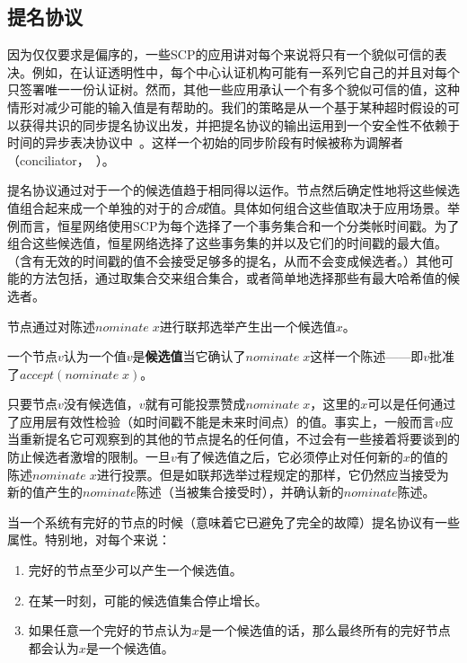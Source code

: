 \subsection{提名协议}

因为仅仅要求{\slot}是偏序的，一些SCP的应用讲对每个{\slot}来说将只有一个貌似可信的表决。例如，在认证透明性中，每个中心认证机构可能有一系列它自己的{\slot}并且对每个{\slot}只签署唯一一份认证树。然而，其他一些应用承认一个{\slot}有多个貌似可信的值，这种情形对减少可能的输入值是有帮助的。我们的策略是从一个基于某种超时假设的可以获得共识的同步提名协议出发，并把提名协议的输出运用到一个安全性不依赖于时间的异步表决协议中~\cite{Lamport:2011:BAL:2075029.2075043}。这样一个初始的同步阶段有时候被称为调解者（conciliator，~\cite{Aspnes:2010:MAS:1835698.1835802}）。

提名协议通过对于一个{\slot}的候选值趋于相同得以运作。节点然后确定性地将这些候选值组合起来成一个单独的对于{\slot}的\textit{合成}值。具体如何组合这些值取决于应用场景。举例而言，恒星网络使用SCP为每个{\slot}选择了一个事务集合和一个分类帐时间戳。为了组合这些候选值，恒星网络选择了这些事务集的并以及它们的时间戳的最大值。（含有无效的时间戳的值不会接受足够多的提名，从而不会变成候选者。）其他可能的方法包括，通过取集合交来组合集合，或者简单地选择那些有最大哈希值的候选者。

节点通过对陈述$nominate\;x$进行联邦选举产生出一个候选值$x$。

\begin{definition}[候选的]
	一个节点$v$认为一个值$v$是\textbf{候选值}当它确认了$nominate\;x$这样一个陈述——即$v$批准了$accept(nominate\;x)$。
\end{definition}

只要节点$v$没有候选值，$v$就有可能投票赞成$nominate\;x$，这里的$x$可以是任何通过了应用层有效性检验（如时间戳不能是未来时间点）的值。事实上，一般而言$v$应当重新提名它可观察到的其他的节点提名的任何值，不过会有一些接着将要谈到的防止候选者激增的限制。一旦$v$有了候选值之后，它必须停止对任何新的$x$的值的陈述$nominate\;x$进行投票。但是如联邦选举过程规定的那样，它仍然应当接受为新的值产生的$nominate$陈述（当被{\vblock}集合接受时），并确认新的$nominate$陈述。

当一个系统有完好的节点的时候（意味着它已避免了完全的故障）提名协议有一些属性。特别地，对每个{\slot}来说：
\begin{enumerate}
	\item\label{enum:cand_p1} 完好的节点至少可以产生一个候选值。
	\item\label{enum:cand_p2} 在某一时刻，可能的候选值集合停止增长。
	\item\label{enum:cand_p3} 如果任意一个完好的节点认为$x$是一个候选值的话，那么最终所有的完好节点都会认为$x$是一个候选值。
\end{enumerate}

